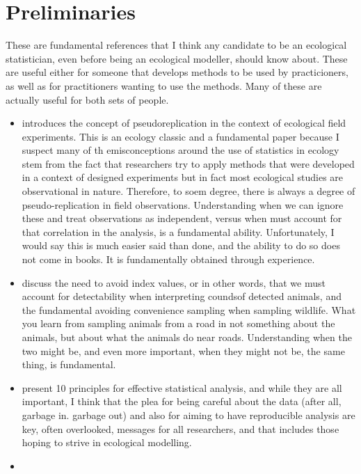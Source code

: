 \documentclass[
]{book}
\begin{document}
\hypertarget{prelim}{%
\chapter{Preliminaries}\label{prelim}}

These are fundamental references that I think any candidate to be an ecological statistician, even before being an ecological modeller, should know about. These are useful either for someone that develops methods to be used by practicioners, as well as for practitioners wanting to use the methods. Many of these are actually useful for both sets of people.

\begin{itemize}
\item
  \citet{Hurlbert1984} introduces the concept of pseudoreplication in the context of ecological field experiments. This is an ecology classic and a fundamental paper because I suspect many of th emisconceptions around the use of statistics in ecology stem from the fact that researchers try to apply methods that were developed in a context of designed experiments but in fact most ecological studies are observational in nature. Therefore, to soem degree, there is always a degree of pseudo-replication in field observations. Understanding when we can ignore these and treat observations as independent, versus when must account for that correlation in the analysis, is a fundamental ability. Unfortunately, I would say this is much easier said than done, and the ability to do so does not come in books. It is fundamentally obtained through experience.
\item
  \citet{AND2001} discuss the need to avoid index values, or in other words, that we must account for detectability when interpreting coundsof detected animals, and the fundamental avoiding convenience sampling when sampling wildlife. What you learn from sampling animals from a road in not something about the animals, but about what the animals do near roads. Understanding when the two might be, and even more important, when they might not be, the same thing, is fundamental.
\item
  \citet{Kass2016} present 10 principles for effective statistical analysis, and while they are all important, I think that the plea for being careful about the data (after all, garbage in. garbage out) and also for aiming to have reproducible analysis are key, often overlooked, messages for all researchers, and that includes those hoping to strive in ecological modelling.
\item

\end{itemize}
\end{document}
